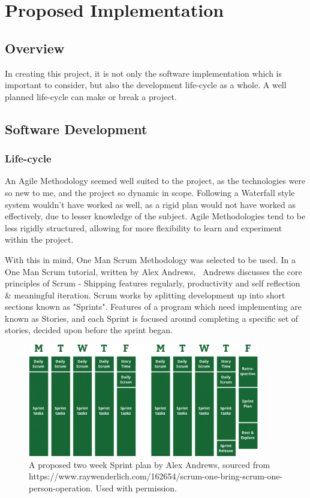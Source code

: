 \documentclass[a4paper,10pt]{report}
\begin{document}
\section{Proposed Implementation}
\subsection{Overview}

In creating this project, it is not only the software implementation which is important to consider, but also the development life-cycle as a whole. A well planned life-cycle can make or break a project. 

\subsection{Software Development}
\subsubsection{Life-cycle}

An Agile Methodology seemed well suited to the project, as the technologies were so new to me, and the project so dynamic in scope. Following a Waterfall style system wouldn't have worked as well, as a rigid plan would not have worked as effectively, due to lesser knowledge of the subject. Agile Methodologies tend to be less rigidly structured, allowing for more flexibility to learn and experiment within the project. \medskip

With this in mind, One Man Scrum Methodology was selected to be used. In a One Man Scrum tutorial, written by Alex Andrews,~\cite{andrews_2017} Andrews discusses the core principles of Scrum - Shipping features regularly, productivity and self reflection \& meaningful iteration. Scrum works by splitting development up into short sections known as "Sprints". Features of a program which need implementing are known as Stories, and each Sprint is focused around completing a specific set of stories, decided upon before the sprint began. \medskip

\begin{figure}[h!]
    \centering
  \includegraphics[width=0.9\textwidth]{Images/External/RayWenderlich.png}
 \caption [A proposed two week Sprint plan by Alex Andrews]{A proposed two week Sprint plan by Alex Andrews, sourced from https://www.raywenderlich.com/162654/scrum-one-bring-scrum-one-person-operation. Used with permission.}
 \label{fig:two_week_sprint_plan}
\end{figure}
\end{document}
